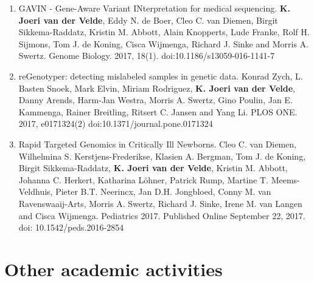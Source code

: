 \begin{appendices}
\begin{enumerate}
\item GAVIN - Gene-Aware Variant INterpretation for medical sequencing. \textbf{K. Joeri van der Velde}, Eddy N. de Boer, Cleo C. van Diemen, Birgit Sikkema-Raddatz, Kristin M. Abbott, Alain Knopperts, Lude Franke, Rolf H. Sijmons, Tom J. de Koning, Cisca Wijmenga, Richard J. Sinke and Morris A. Swertz. Genome Biology. 2017, 18(1). doi:10.1186/s13059-016-1141-7
\item reGenotyper: detecting mislabeled samples in genetic data. Konrad Zych, L. Basten Snoek, Mark Elvin, Miriam Rodriguez, \textbf{K. Joeri van der Velde}, Danny Arends, Harm-Jan Westra, Morris A. Swertz, Gino Poulin, Jan E. Kammenga, Rainer Breitling, Ritsert C. Jansen and Yang Li. PLOS ONE. 2017, e0171324(2) doi:10.1371/journal.pone.0171324
\item Rapid Targeted Genomics in Critically Ill Newborns. Cleo C. van Diemen, Wilhelmina S. Kerstjens-Frederikse, Klasien A. Bergman, Tom J. de Koning, Birgit Sikkema-Raddatz, \textbf{K. Joeri van der Velde}, Kristin M. Abbott, Johanna C. Herkert, Katharina Löhner, Patrick Rump, Martine T. Meems-Veldhuis, Pieter B.T. Neerincx, Jan D.H. Jongbloed, Conny M. van Ravenswaaij-Arts, Morris A. Swertz, Richard J. Sinke, Irene M. van Langen and Cisca Wijmenga. Pediatrics 2017. Published Online September 22, 2017. doi: 10.1542/peds.2016-2854
\end{enumerate}

\chapter{Other academic activities}


\end{appendices}
